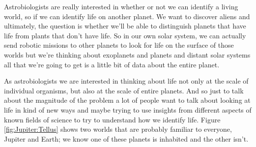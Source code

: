 \documentclass[]{article}
\begin{document}
Astrobiologists are really interested in whether or not we can identify a living world, so if we can identify life on another planet.
We want to discover aliens and ultimately, the question is whether we'll be able to distinguish planets that have life from plants that don't have life. So in our own solar system, we can actually send robotic missions to other planets to look for life on the surface of those worlds but we're thinking about exoplanets and planets and distant solar systems all that we're going to get is a little bit of data about the entire planet.

As astrobiologists we are interested in thinking about life not only at the scale of individual organisms, but also at the scale of entire planets. 
And so just to talk about the magnitude of the problem a lot of people want to talk about looking at life in kind of new ways and maybe trying to use insights from different aspects of known fields of science to try to understand how we identify life.
Figure \ref{fig:Jupiter:Tellus} shows two worlds that are probably familiar to everyone, Jupiter and Earth; we know one of these planets is inhabited and the other isn't.
\end{document}
